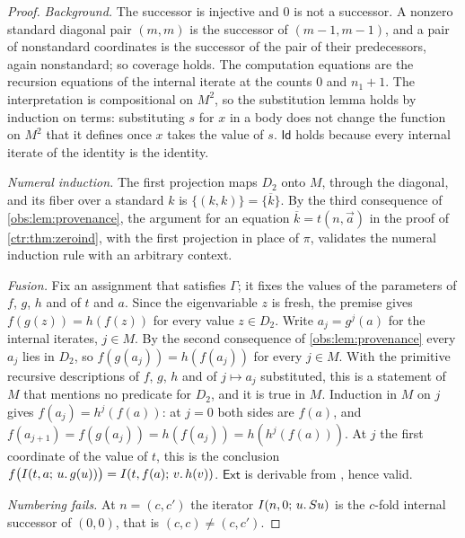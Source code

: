 \begin{proof}
\emph{Background.} The successor is injective and $0$ is not a successor. A
nonzero standard diagonal pair $(m,m)$ is the successor of $(m-1,m-1)$, and a
pair of nonstandard coordinates is the successor of the pair of their
predecessors, again nonstandard; so coverage holds. The computation equations
are the recursion equations of the internal iterate at the counts $0$ and
$n_1+1$. The interpretation is compositional on $M^{2}$, so the substitution
lemma holds by induction on terms: substituting $s$ for $x$ in a body does not
change the function on $M^{2}$ that it defines once $x$ takes the value of $s$.
$\mathsf{Id}$ holds because every internal iterate of the identity is the
identity.

\emph{Numeral induction.} The first projection maps $D_2$ onto $M$, through
the diagonal, and its fiber over a standard $k$ is $\{(k,k)\}=\{\overline{k}\}$.
By the third consequence of \cref{obs:lem:provenance}, the argument for an
equation $\overline{k}=t(n,\vec a)$ in the proof of \cref{ctr:thm:zeroind},
with the first projection in place of $\pi$, validates the numeral induction
rule with an arbitrary context.

\emph{Fusion.} Fix an assignment that satisfies $\Gamma$; it fixes the values
of the parameters of $f$, $g$, $h$ and of $t$ and $a$. Since the eigenvariable
$z$ is fresh, the premise gives $f(g(z))=h(f(z))$ for every value $z\in D_2$.
Write $a_j=g^{j}(a)$ for the internal iterates, $j\in M$. By the second consequence
of \cref{obs:lem:provenance} every $a_j$ lies in $D_2$, so
$f(g(a_j))=h(f(a_j))$ for every $j\in M$. With the primitive recursive
descriptions of $f$, $g$, $h$ and of $j\mapsto a_j$ substituted, this is a
statement of $M$ that mentions no predicate for $D_2$, and it is true in $M$.
Induction in $M$ on $j$ gives $f(a_j)=h^{j}(f(a))$: at $j=0$ both sides are
$f(a)$, and $f(a_{j+1})=f(g(a_j))=h(f(a_j))=h(h^{j}(f(a)))$. At $j$ the first
coordinate of the value of $t$, this is the conclusion
$f\bigl(I(t,a;\,u.\,g(u))\bigr)=I(t,f(a);\,v.\,h(v))$. $\mathsf{Ext}$ is
derivable from , hence valid.

\emph{Numbering fails.} At $n=(c,c')$ the iterator $I(n,0;\,u.\,S u)$ is the
$c$-fold internal successor of $(0,0)$, that is $(c,c)\ne(c,c')$.


\end{proof}
